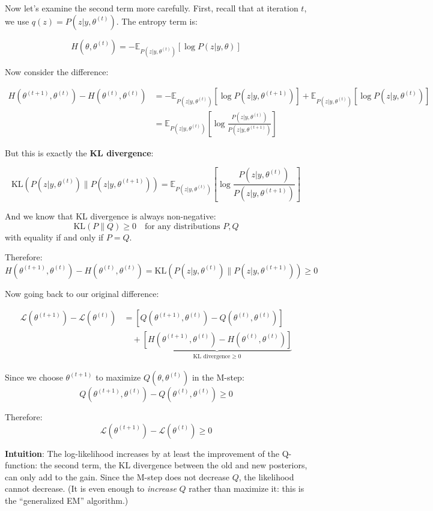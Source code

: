 \begin{notechapter}
Now let's examine the second term more carefully. First, recall that at iteration $t$, we use $q(z) = P(z|y,\theta^{(t)})$. The entropy term is:

\[
H(\theta, \theta^{(t)}) = -\mathbb{E}_{P(z|y,\theta^{(t)})}[\log P(z|y,\theta)]
\]

Now consider the difference:

\begin{align*}
H(\theta^{(t+1)}, \theta^{(t)}) - H(\theta^{(t)}, \theta^{(t)}) 
&= -\mathbb{E}_{P(z|y,\theta^{(t)})}[\log P(z|y,\theta^{(t+1)})] + \mathbb{E}_{P(z|y,\theta^{(t)})}[\log P(z|y,\theta^{(t)})] \\
&= \mathbb{E}_{P(z|y,\theta^{(t)})}\left[\log\frac{P(z|y,\theta^{(t)})}{P(z|y,\theta^{(t+1)})}\right]
\end{align*}

But this is exactly the \textbf{KL divergence}:

\[
\text{KL}(P(z|y,\theta^{(t)}) \| P(z|y,\theta^{(t+1)})) = \mathbb{E}_{P(z|y,\theta^{(t)})}\left[\log\frac{P(z|y,\theta^{(t)})}{P(z|y,\theta^{(t+1)})}\right]
\]

And we know that KL divergence is always non-negative:
\[
\text{KL}(P \| Q) \geq 0 \quad \text{for any distributions } P, Q
\]
with equality if and only if $P = Q$.

Therefore:
\[
H(\theta^{(t+1)}, \theta^{(t)}) - H(\theta^{(t)}, \theta^{(t)}) = \text{KL}(P(z|y,\theta^{(t)}) \| P(z|y,\theta^{(t+1)})) \geq 0
\]

Now going back to our original difference:

\begin{align*}
\mathcal{L}(\theta^{(t+1)}) - \mathcal{L}(\theta^{(t)}) 
&= [Q(\theta^{(t+1)}, \theta^{(t)}) - Q(\theta^{(t)}, \theta^{(t)})] \\
&\quad + \underbrace{[H(\theta^{(t+1)}, \theta^{(t)}) - H(\theta^{(t)}, \theta^{(t)})]}_{\text{KL divergence} \geq 0}
\end{align*}

Since we choose $\theta^{(t+1)}$ to maximize $Q(\theta, \theta^{(t)})$ in the M-step:
\[
Q(\theta^{(t+1)}, \theta^{(t)}) - Q(\theta^{(t)}, \theta^{(t)}) \geq 0
\]

Therefore:
\[
\mathcal{L}(\theta^{(t+1)}) - \mathcal{L}(\theta^{(t)}) \geq 0
\]

\textbf{Intuition}: The log-likelihood increases by at least the improvement of the Q-function: the second term, the KL divergence between the old and new posteriors, can only add to the gain. Since the M-step does not decrease $Q$, the likelihood cannot decrease. (It is even enough to \emph{increase} $Q$ rather than maximize it: this is the ``generalized EM'' algorithm.)


\end{notechapter}
